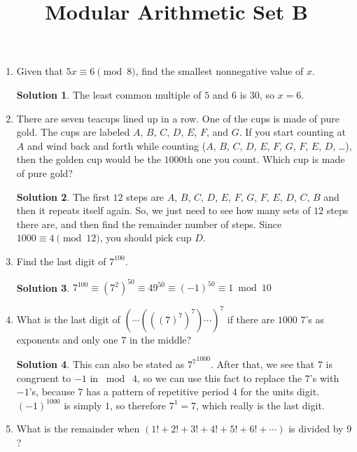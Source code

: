 \documentclass{article}
\title{Modular Arithmetic Set B}
\date{}
\author{}
\theoremstyle{definition}
\newtheorem*{solution}{Solution}
\begin{document}
\maketitle
\begin{multicols}{2}
    \raggedcolumns
    \begin{enumerate}
        \item Given that $5x \equiv 6 \pmod{8}$, find the smallest nonnegative value of $x$.
            \begin{solution}
                The least common multiple of $5$ and $6$ is $30$, so $x = 6$.
            \end{solution}
        \item There are seven teacups lined up in a row.
            One of the cups is made of pure gold.
            The cups are labeled $A$, $B$, $C$, $D$, $E$, $F$, and $G$.
            If you start counting at $A$ and wind back and forth while counting ($A$, $B$, $C$, $D$, $E$, $F$, $G$, $F$, $E$, $D$, \dots), then the golden cup would be the $1000$th one you count.
            Which cup is made of pure gold?
            \begin{solution}
                The first $12$ steps are $A$, $B$, $C$, $D$, $E$, $F$, $G$, $F$, $E$, $D$, $C$, $B$ and then it repeats itself again.
                So, we just need to see how many sets of $12$ steps there are, and then find the remainder number of steps.
                Since $1000 \equiv 4 \pmod{12}$, you should pick cup $D$.
            \end{solution}
        \item Find the last digit of $7^{100}$.
            \begin{solution}
                $7^{100} \equiv (7^2)^{50} \equiv 49^{50} \equiv (-1)^{50} \equiv 1 \bmod 10$
            \end{solution}
        \item What is the last digit of $(\cdots(((7)^7)^7)\cdots)^7$ if there are $1000$ $7$'s as exponents and only one $7$ in the middle?
            \begin{solution}
                This can also be stated as ${7^7}^{1000}$.
                After that, we see that $7$ is congruent to $-1$ in $\bmod \; 4$, so we can use this fact to replace the $7$'s with $-1$'s, because $7$ has a pattern of repetitive period $4$ for the units digit.
                $(-1)^{1000}$ is simply $1$, so therefore $7^1 = 7$, which really is the last digit.
            \end{solution}
        \item What is the remainder when $(1! + 2! + 3! + 4! + 5! + 6! + \cdots)$ is divided by $9$?

\end{enumerate}
\end{multicols}
\end{document}
